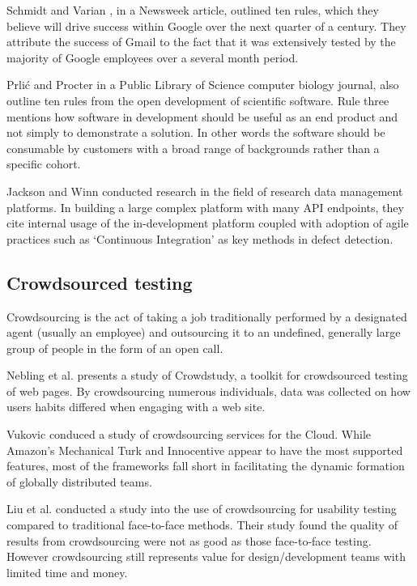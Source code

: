 Schmidt and Varian \cite{schmidt2005google}, in a Newsweek article, outlined ten rules, which they believe will drive success within Google over the next quarter of a century. They attribute the success of Gmail to the fact that it was extensively tested by the majority of Google employees over a several month period.

Prli\'c and Procter \cite{prlic2012ten} in a Public Library of Science computer biology journal, also outline ten rules from the open development of scientific software. Rule three mentions how software in development should be useful as an end product and not simply to demonstrate a solution. In other words the software should be consumable by customers with a broad range of backgrounds rather than a specific cohort.

Jackson and Winn \cite{jackson2012eating} conducted research in the field of research data management platforms. In building a large complex platform with many API endpoints, they cite internal usage of the in-development platform coupled with adoption of agile practices such as `Continuous Integration'\cite{wikiCI} as key methods in defect detection.


\subsection{Crowdsourced testing}

Crowdsourcing is the act of taking a job traditionally performed by a designated agent (usually an employee) and outsourcing it to an undefined, generally large group of people in the form of an open call\cite{crowdsourcedef}.

Nebling et al. \cite{nebeling2012crowdsourced} presents a study of Crowdstudy, a toolkit for crowdsourced testing of web pages. By crowdsourcing numerous individuals, data was collected on how users habits differed when engaging with a web site. 

Vukovic \cite{Vukovic2009crowdsourcing} conduced a study of crowdsourcing services for the Cloud. While Amazon's Mechanical Turk and Innocentive appear to have the most supported features, most of the frameworks fall short in facilitating the dynamic formation of globally distributed teams. 

Liu et al. \cite{liu2012crowdsourcing} conducted a study into the use of crowdsourcing for usability testing compared to traditional face-to-face methods. Their study found the quality of results from crowdsourcing were not as good as those face-to-face testing. However crowdsourcing still represents value for design/development teams with limited time and money.

